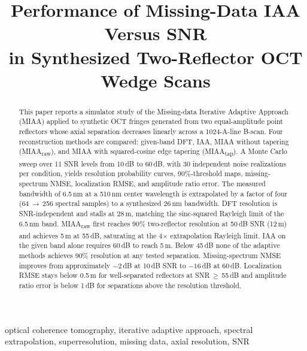 \documentclass[conference]{IEEEtran}
\begin{document}
\title{Performance of Missing-Data IAA Versus SNR\\in Synthesized Two-Reflector OCT Wedge Scans}

\author{
}

\maketitle

\begin{abstract}
This paper reports a simulator study of the Missing-data Iterative
Adaptive Approach (MIAA) applied to synthetic OCT fringes generated
from two equal-amplitude point reflectors whose axial separation
decreases linearly across a 1024-A-line B-scan. Four reconstruction
methods are compared: given-band DFT, IAA, MIAA without tapering
(MIAA\textsubscript{raw}), and MIAA with squared-cosine edge tapering
(MIAA\textsubscript{tap}). A Monte Carlo sweep over 11 SNR levels from
10\,dB to 60\,dB, with 30 independent noise realizations per
condition, yields resolution probability curves, 90\%-threshold maps,
missing-spectrum NMSE, localization RMSE, and amplitude ratio error.
The measured bandwidth of 6.5\,nm at a 510\,nm center wavelength is
extrapolated by a factor of four (64\,$\to$\,256 spectral samples) to
a synthesized 26\,nm bandwidth. DFT resolution is SNR-independent and
stalls at 28\,\textmu m, matching the sinc-squared Rayleigh limit of
the 6.5\,nm band. MIAA\textsubscript{raw} first reaches 90\%
two-reflector resolution at 50\,dB SNR (12\,\textmu m) and achieves
5\,\textmu m at 55\,dB, saturating at the 4$\times$ extrapolation
Rayleigh limit. IAA on the given band alone requires 60\,dB to reach
5\,\textmu m. Below 45\,dB none of the adaptive methods achieves 90\%
resolution at any tested separation. Missing-spectrum NMSE improves
from approximately $-2$\,dB at 10\,dB SNR to $-16$\,dB at 60\,dB.
Localization RMSE stays below 0.5\,\textmu m for well-separated
reflectors at SNR\,$\geq$\,55\,dB and amplitude ratio error is below
1\,dB for separations above the resolution threshold.
\end{abstract}

\begin{IEEEkeywords}
optical coherence tomography, iterative adaptive approach, spectral
extrapolation, superresolution, missing data, axial resolution, SNR
\end{IEEEkeywords}
\end{document}

